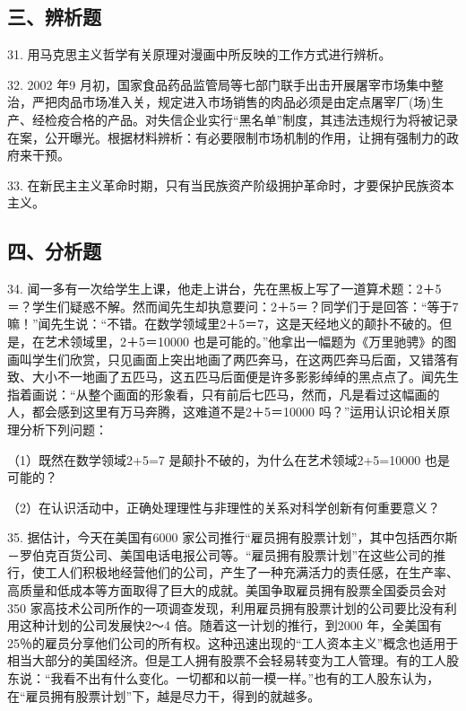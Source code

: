 \documentclass[UTF8,11pt]{ctexart}
\begin{document}
\subsection*{三、辨析题}

31. 用马克思主义哲学有关原理对漫画中所反映的工作方式进行辨析。


32. 2002 年9 月初，国家食品药品监管局等七部门联手出击开展屠宰市场集中整治，严把肉品市场准入关，规定进入市场销售的肉品必须是由定点屠宰厂(场)生产、经检疫合格的产品。对失信企业实行“黑名单”制度，其违法违规行为将被记录在案，公开曝光。根据材料辨析：有必要限制市场机制的作用，让拥有强制力的政府来干预。


33. 在新民主主义革命时期，只有当民族资产阶级拥护革命时，才要保护民族资本主义。


\subsection*{四、分析题}

34. 闻一多有一次给学生上课，他走上讲台，先在黑板上写了一道算术题：2＋5＝？学生们疑惑不解。然而闻先生却执意要问：2＋5＝？同学们于是回答：“等于7 嘛！”闻先生说：“不错。在数学领域里2＋5＝7，这是天经地义的颠扑不破的。但是，在艺术领域里，2＋5＝10000 也是可能的。”他拿出一幅题为《万里驰骋》的图画叫学生们欣赏，只见画面上突出地画了两匹奔马，在这两匹奔马后面，又错落有致、大小不一地画了五匹马，这五匹马后面便是许多影影绰绰的黑点点了。闻先生指着画说：“从整个画面的形象看，只有前后七匹马，然而，凡是看过这幅画的人，都会感到这里有万马奔腾，这难道不是2＋5＝10000 吗？”运用认识论相关原理分析下列问题：


（1）既然在数学领域2+5=7 是颠扑不破的，为什么在艺术领域2+5=10000 也是可能的？


（2）在认识活动中，正确处理理性与非理性的关系对科学创新有何重要意义？


35. 据估计，今天在美国有6000 家公司推行“雇员拥有股票计划”，其中包括西尔斯－罗伯克百货公司、美国电话电报公司等。“雇员拥有股票计划”在这些公司的推行，使工人们积极地经营他们的公司，产生了一种充满活力的责任感，在生产率、高质量和低成本等方面取得了巨大的成就。美国争取雇员拥有股票全国委员会对350 家高技术公司所作的一项调查发现，利用雇员拥有股票计划的公司要比没有利用这种计划的公司发展快2～4 倍。随着这一计划的推行，到2000 年，全美国有25％的雇员分享他们公司的所有权。这种迅速出现的“工人资本主义”概念也适用于相当大部分的美国经济。但是工人拥有股票不会轻易转变为工人管理。有的工人股东说：“我看不出有什么变化。一切都和以前一模一样。”也有的工人股东认为，在“雇员拥有股票计划”下，越是尽力干，得到的就越多。
\end{document}

